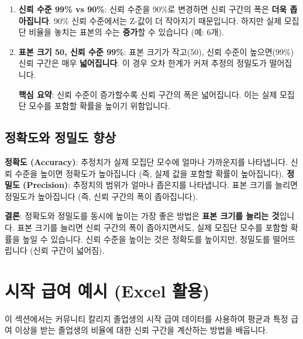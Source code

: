 \documentclass[11pt,a4paper]{book}
\theoremstyle{definition}
\begin{document}
\begin{enumerate}
\begin{enumerate}
\begin{enumerate}
    \item \textbf{신뢰 수준 99\% vs 90\%}:
    신뢰 수준을 90\%로 변경하면 신뢰 구간의 폭은 \textbf{더욱 좁아집니다}. 90\% 신뢰 수준에서는 Z-값이 더 작아지기 때문입니다. 하지만 실제 모집단 비율을 놓치는 표본의 수는 \textbf{증가}할 수 있습니다 (예: 6개).

    \item \textbf{표본 크기 50, 신뢰 수준 99\%}:
    표본 크기가 작고(50), 신뢰 수준이 높으면(99\%) 신뢰 구간은 매우 \textbf{넓어집니다}. 이 경우 오차 한계가 커져 추정의 정밀도가 떨어집니다.
    \begin{summarybox}
        \textbf{핵심 요약}: 신뢰 수준이 증가할수록 신뢰 구간의 폭은 넓어집니다. 이는 실제 모집단 모수를 포함할 확률을 높이기 위함입니다.
    \end{summarybox}
\end{enumerate}

\subsection{정확도와 정밀도 향상}
\begin{examplebox}[title=정확도와 정밀도 향상 전략]
    \textbf{정확도 (Accuracy)}: 추정치가 실제 모집단 모수에 얼마나 가까운지를 나타냅니다. 신뢰 수준을 높이면 정확도가 높아집니다 (즉, 실제 값을 포함할 확률이 높아집니다).
    \textbf{정밀도 (Precision)}: 추정치의 범위가 얼마나 좁은지를 나타냅니다. 표본 크기를 늘리면 정밀도가 높아집니다 (즉, 신뢰 구간의 폭이 좁아집니다).

    \textbf{결론}: 정확도와 정밀도를 동시에 높이는 가장 좋은 방법은 \textbf{표본 크기를 늘리는 것}입니다. 표본 크기를 늘리면 신뢰 구간의 폭이 좁아지면서도, 실제 모집단 모수를 포함할 확률을 높일 수 있습니다. 신뢰 수준을 높이는 것은 정확도를 높이지만, 정밀도를 떨어뜨립니다 (신뢰 구간이 넓어짐).
\end{examplebox}


\section{시작 급여 예시 (Excel 활용)}
이 섹션에서는 커뮤니티 칼리지 졸업생의 시작 급여 데이터를 사용하여 평균과 특정 급여 이상을 받는 졸업생의 비율에 대한 신뢰 구간을 계산하는 방법을 배웁니다.


\end{enumerate}
\end{enumerate}
\end{document}
